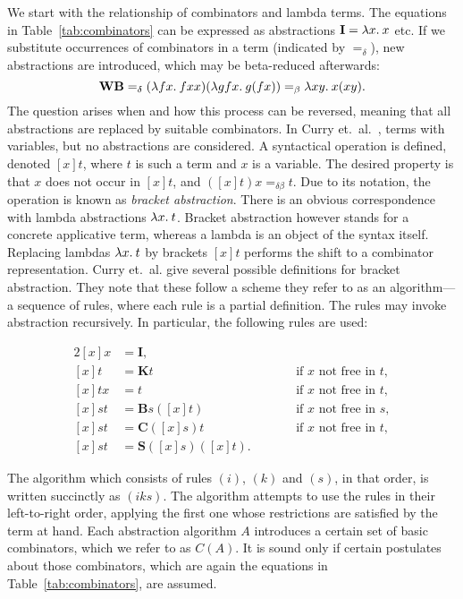 We start with the relationship of combinators and lambda terms.
The equations in Table~\ref{tab:combinators} can be expressed as abstractions
$\mathbf{I} = \lambda x.\>x$ etc.
If we substitute occurrences of combinators in a term (indicated by $=_\delta$),
new abstractions are introduced, which may be beta-reduced afterwards:
\[ \mathbf{WB} =_\delta (\lambda fx.\>fxx)(\lambda gfx.\>g(fx)) =_\beta \lambda xy.\>x(xy). \]
The question arises when and how this process can be reversed, meaning that
all abstractions are replaced by suitable combinators.
In Curry et.~al.~\cite[Section~6A]{curry68}, terms with variables, but no
abstractions are considered.
A syntactical operation is defined, denoted $[x]t$, where $t$ is such a term
and $x$ is a variable.
The desired property is that $x$ does not occur in $[x]t$, and
$([x]t)x =_{\delta\beta} t$.
Due to its notation, the operation is known as \emph{bracket abstraction}.
There is an obvious correspondence with lambda abstractions $\lambda x.\>t$.
Bracket abstraction however stands for a concrete applicative term, whereas
a lambda is an object of the syntax itself.
Replacing lambdas $\lambda x.\>t$ by brackets $[x]t$ performs the shift to a
combinator representation.
Curry et.\ al. give several possible definitions for bracket abstraction.
They note that these follow a scheme they refer to as an algorithm---a sequence
of rules, where each rule is a partial definition.
The rules may invoke abstraction recursively.
In particular, the following rules are used:

\begin{alignat}{2}
	\tag{$i$} [x]x &= \mathbf{I}, && \\
	\tag{$k$} [x]t &= \mathbf{K} t &&\qquad\text{if $x$ not free in $t$}, \\
	\tag{$\eta$} [x]tx &= t &&\qquad\text{if $x$ not free in $t$}, \\
	\tag{$b$} [x]st &= \mathbf{B}s([x]t) &&\qquad\text{if $x$ not free in $s$}, \\
	\tag{$c$} [x]st &= \mathbf{C}([x]s)t &&\qquad\text{if $x$ not free in $t$}, \\
	\tag{$s$} [x]st &= \mathbf{S}([x]s)([x]t). &&
\end{alignat}

The algorithm which consists of rules $(i)$, $(k)$ and $(s)$, in that order,
is written succinctly as $(iks)$.
The algorithm attempts to use the rules in their left-to-right order, applying
the first one whose restrictions are satisfied by the term at hand.
Each abstraction algorithm $A$ introduces a certain set of basic combinators,
which we refer to as $C(A)$.
It is sound only if certain postulates about those combinators, which are again
the equations in Table~\ref{tab:combinators}, are assumed.

